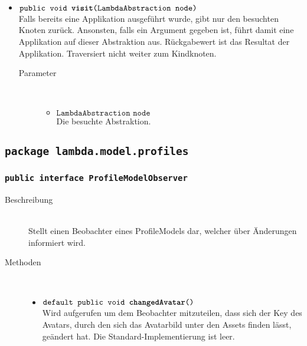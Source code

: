 \begin{description}
\begin{itemize}
		\item $\texttt{public void \textbf{visit}(LambdaAbstraction node)}$ \\ Falls bereits eine Applikation ausgeführt wurde, gibt nur den besuchten Knoten zurück. Ansonsten, falls ein Argument gegeben ist, führt damit eine Applikation auf dieser Abstraktion aus. Rückgabewert ist das Resultat der Applikation. Traversiert nicht weiter zum Kindknoten.
		\begin{description}
			\item[Parameter] \hfill \\
			\vspace{-.8cm}
			\begin{itemize}
				\item $\texttt{LambdaAbstraction node}$ \\ Die besuchte Abstraktion.
			\end{itemize}
		\end{description}
	\end{itemize}
\end{description}

\subsection{\texttt{package lambda.model.profiles}}

\subsubsection{\normalfont \texttt{public interface \textbf{ProfileModelObserver}}}

\begin{description}
\item[Beschreibung] \hfill \\ Stellt einen Beobachter eines ProfileModels dar, welcher über Änderungen informiert wird.

\item[Methoden] \hfill \\
	\vspace{-.8cm}
	\begin{itemize}
		\item $\texttt{default public void \textbf{changedAvatar}()}$ \\ Wird aufgerufen um dem Beobachter mitzuteilen, 
		dass sich der Key des Avatars, durch den sich das Avatarbild unter den Assets finden lässt, geändert hat. Die Standard-Implementierung ist leer.
	\end{itemize}
\end{description}

